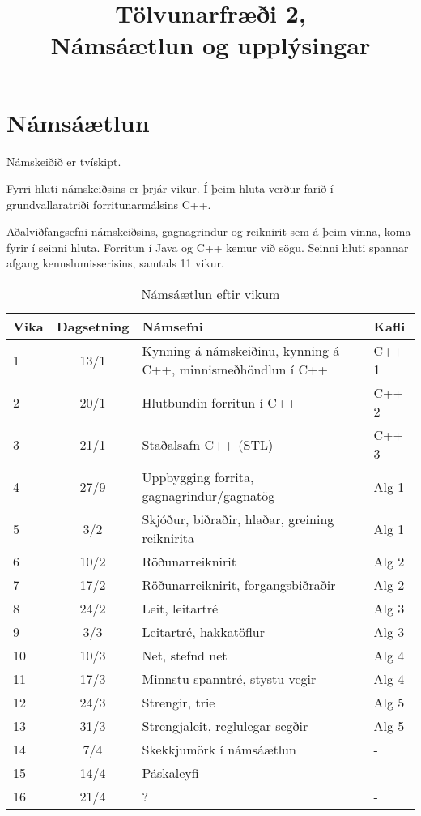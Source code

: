 \documentclass{article}
\title{Tölvunarfræði 2, \semester \\ Námsáætlun og upplýsingar}
\author{}
\begin{document}
\maketitle
{}

\section{Námsáætlun}
\label{sec:schedule}

Námskeiðið er tvískipt. 

Fyrri hluti námskeiðsins er þrjár vikur. Í þeim hluta verður farið í grundvallaratriði forritunarmálsins C++.

Aðalviðfangsefni námskeiðsins, gagnagrindur og reiknirit sem á þeim vinna, koma fyrir í seinni hluta. Forritun í Java og C++ kemur við sögu. Seinni hluti spannar afgang kennslumisserisins, samtals 11 vikur.

\begin{table}
\caption{Námsáætlun eftir vikum}
\label{tab:schedule}
\begin{center}
\renewcommand{\arraystretch}{1.2}
\begin{tabularx}{\linewidth}{lcXp{1cm}}
\toprule
Vika&Dagsetning&Námsefni&Kafli\\
\midrule
1	&13/1	& Kynning á námskeiðinu, kynning á C++, minnismeðhöndlun í C++&C++ 1\\
2	&20/1	& Hlutbundin forritun í C++&C++ 2\\
3	&21/1	& Staðalsafn C++ (STL)&C++ 3\\
4	&27/9	& Uppbygging forrita, gagnagrindur/gagnatög&Alg 1\\
5	&3/2	& Skjóður, biðraðir, hlaðar, greining reiknirita&Alg 1\\
6	&10/2	& Röðunarreiknirit&Alg 2\\
7	&17/2	& Röðunarreiknirit, forgangsbiðraðir&Alg 2\\
8	&24/2	& Leit, leitartré&Alg 3\\
9	&3/3	& Leitartré, hakkatöflur&Alg 3\\
10	&10/3	& Net, stefnd net&Alg 4\\
11	&17/3	& Minnstu spanntré, stystu vegir&Alg 4\\
12	&24/3	& Strengir, trie&Alg 5\\
13	&31/3	& Strengjaleit, reglulegar segðir&Alg 5\\
14	&7/4	& Skekkjumörk í námsáætlun&-\\
15	&14/4	& Páskaleyfi&-\\
16	&21/4	& ?&-\\
\bottomrule
\end{tabularx}
\end{center}
\end{table}
\end{document}

